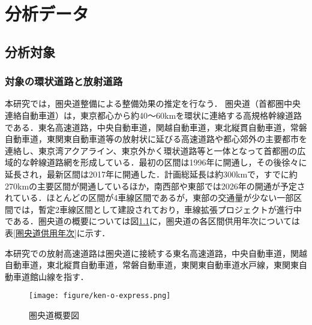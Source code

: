 \chapter{分析データ}

\section{分析対象}
\subsection{対象の環状道路と放射道路}
本研究では，圏央道整備による整備効果の推定を行なう．
圏央道（首都圏中央連絡自動車道）は，東京都心から約40〜60kmを環状に連絡する高規格幹線道路である．東名高速道路，中央自動車道，関越自動車道，東北縦貫自動車道，常磐自動車道，東関東自動車道等の放射状に延びる高速道路や都心郊外の主要都市を連絡し、東京湾アクアライン、東京外かく環状道路等と一体となって首都圏の広域的な幹線道路網を形成している\cite{kokudo2024}．最初の区間は1996年に開通し，その後徐々に延長され，最新区間は2017年に開通した．計画総延長は約300kmで，すでに約270kmの主要区間が開通しているほか，南西部や東部では2026年の開通が予定されている．ほとんどの区間が4車線区間であるが，東部の交通量が少ない一部区間では，暫定2車線区間として建設されており，車線拡張プロジェクトが進行中である．圏央道の概要については図\ref{fig:ken-o-express}に，圏央道の各区間供用年次については表\ref{圏央道供用年次}に示す．

本研究での放射高速道路は圏央道に接続する東名高速道路，中央自動車道，関越自動車道，東北縦貫自動車道，常磐自動車道，東関東自動車道水戸線，東関東自動車道館山線を指す．

\begin{figure}[H]
  \centering
  \texttt{[image: figure/ken-o-express.png]}
  \caption{圏央道概要図}
  \label{fig:ken-o-express}
\end{figure}

